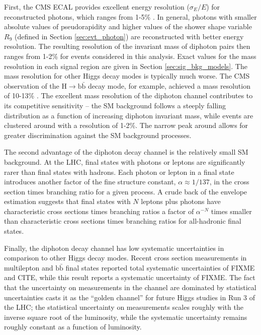 First, the CMS ECAL provides excellent energy resolution ($\sigma_E/E$) for reconstructed photons, which ranges from 1-5\% \cite{Chatrchyan:2013dga}.
In general, photons with smaller absolute values of pseudorapidity and higher values of the shower shape variable $R_9$ (defined in Section \ref{sec:evt_photon}) are reconstructed with better energy resolution.
The resulting resolution of the invariant mass of diphoton pairs then ranges from 1-2\% for events considered in this analysis.
Exact values for the mass resolution in each signal region are given in Section \ref{sec:sig_bkg_models}.
The mass resolution for other Higgs decay modes is typically much worse.
The CMS observation of the $\text{H} \to \text{b}\bar{\text{b}}$ decay mode, for example, achieved a mass resolution of 10-13\% \cite{Hbb_obs}.
The excellent mass resolution of the diphoton channel contributes to its competitive sensitivity -- the SM background follows a steeply falling distribution as a function of increasing diphoton invariant mass, while \Hgg events are clustered around \mH with a resolution of 1-2\%.
The narrow peak around \mH allows for greater discrimination against the SM background processes.

The second advantage of the diphoton decay channel is the relatively small SM background.
At the LHC, final states with photons or leptons are significantly rarer than final states with hadrons.
Each photon or lepton in a final state introduces another factor of the fine structure constant, $\alpha \approx 1/137$, in the cross section times branching ratio for a given process. 
A crude back of the envelope estimation suggests that final states with $N$ leptons plus photons have characteristic cross sections times branching ratios a factor of $\alpha^{-N}$ times smaller than characteristic cross sections times branching ratios for all-hadronic final states.

Finally, the diphoton decay channel has low systematic uncertainties in comparison to other Higgs decay modes.
Recent \ttH cross section measurements in multilepton and $\text{b}\bar{\text{b}}$ final states reported total systematic uncertainties of FIXME and CITE, while this result reports a systematic uncertainty of FIXME.
The fact that the uncertainty on measurements in the \Hgg channel are dominated by statistical uncertainties casts it as the ``golden channel'' for future Higgs studies in Run 3 of the LHC; the statistical uncertainty on measurements scales roughly with the inverse square root of the luminosity, while the systematic uncertainty remains roughly constant as a function of luminosity.

